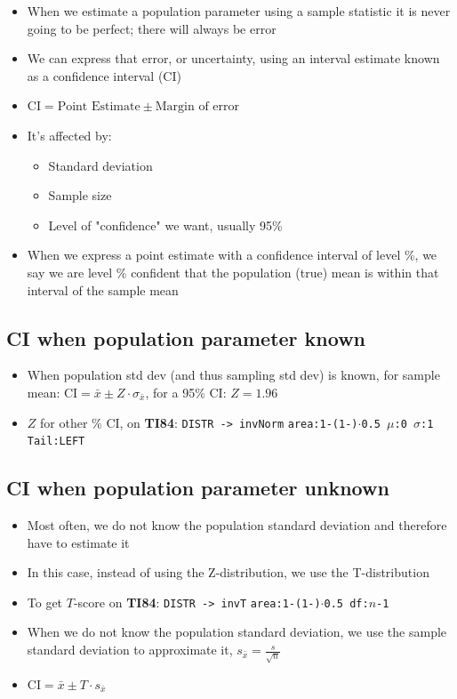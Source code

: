 \documentclass{article}
\newcommand{\code}[1]{\colorbox{light-gray}{\texttt{#1}}}
\begin{document}
\begin{itemize}
    \item When we estimate a population parameter using a sample statistic it is never going to be perfect; there will always be error
    \item We can express that error, or uncertainty, using an interval estimate known as a confidence interval (CI)
    \item $\text{CI} = \text{Point Estimate} \pm \text{Margin of error}$
    \item It's affected by:
    \begin{itemize}
        \item Standard deviation
        \item Sample size
        \item Level of "confidence" we want, usually 95\%
    \end{itemize}
    \item When we express a point estimate with a confidence interval of level \%, we say we are level \% confident that the population (true) mean is within that interval of the sample mean
\end{itemize}

\subsection{CI when population parameter known}

\begin{itemize}
    \item When population std dev (and thus sampling std dev) is known, for sample mean: $\text{CI}=\bar{x} \pm Z \cdot \sigma_{\bar{x}}$, for a 95\% CI: $Z=1.96$
    \item $Z$ for other \% CI, on \textbf{TI84}: \code{DISTR -> invNorm} \code{area:1-(1-\text{\%})$\cdot$0.5 $\mu$:0 $\sigma$:1 Tail:LEFT}
\end{itemize}

\subsection{CI when population parameter unknown}

\begin{itemize}
    \item Most often, we do not know the population standard deviation and therefore have to estimate it
    \item In this case, instead of using the Z-distribution, we use the T-distribution
    \item To get $T$-score on \textbf{TI84}: \code{DISTR -> invT} \code{area:1-(1-\text{\%})$\cdot$0.5 df:$n$-1}
    \item When we do not know the population standard deviation, we use the sample standard deviation to approximate it, $s_{\bar{x}}=\frac{s}{\sqrt{n}}$
    \item $\text{CI} = \bar{x} \pm T \cdot s_{\bar{x}}$
\end{itemize}
\end{document}
